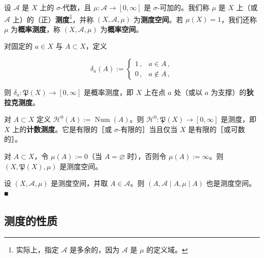 设 $ \mathcal{A} $ 是 $ X $ 上的 $ \sigma $-代数，且 $ \mu\colon \mathcal{A} \to [0,\infty] $ 是 $ \sigma $-可加的。我们称 $ \mu $ 是 $ X $ 上（或 $ \mathcal{A} $ 上）的（正）\textbf{测度}\footnote{实际上，指定 $ \mathcal{A} $ 是多余的，因为 $ \mathcal{A} $ 是 $ \mu $ 的定义域。}，并称 $ (X, \mathcal{A}, \mu) $ 为\textbf{测度空间}。若 $ \mu(X) = 1 $，我们还称 $ \mu $ 为\textbf{概率测度}，称 $ (X, \mathcal{A}, \mu) $ 为\textbf{概率空间}。

\begin{example}

\begin{items}
\item

对固定的 $ a \in X $ 与 $ A \subset X $，定义

\begin{equation*}
\delta_a(A) := \begin{cases} 1\,, & a \in A\,, \\ 0\,, & a \notin A\,, \end{cases}
\end{equation*}

则 $ \delta_a\colon \mathfrak{P}(X) \to [0,\infty] $ 是概率测度，即 $ X $ 上在点 $ a $ 处（或以 $ a $ 为支撑）的\textbf{狄拉克测度}。

\item

对 $ A \subset X $ 定义 $ \mathcal{H}^0(A) := \operatorname{Num}(A) $。则 $ \mathcal{H}^0\colon \mathfrak{P}(X) \to [0,\infty] $ 是测度，即 $ X $ 上的\textbf{计数测度}。它是有限的［或 $ \sigma $-有限的］当且仅当 $ X $ 是有限的［或可数的］。

\item

对 $ A \subset X $，令 $ \mu(A) := 0 $（当 $ A = \varnothing $ 时），否则令 $ \mu(A) := \infty $。则 $ (X, \mathfrak{P}(X), \mu) $ 是测度空间。

\item

设 $ (X, \mathcal{A}, \mu) $ 是测度空间，并取 $ A \in \mathcal{A} $。则 $ (A, \mathcal{A} \mid A, \mu \mid A) $ 也是测度空间。\nobreak\hspace{0.35em}■

\end{items}

\end{example}

\subsection*{测度的性质}


